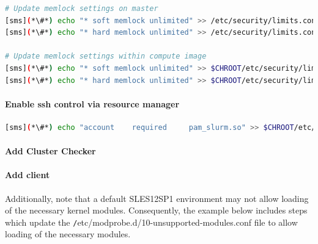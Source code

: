 \documentclass[letterpaper]{article}
\newcommand{\baseOS}{SLES12SP1}
\begin{document}
 

\begin{lstlisting}[language=bash,keywords={},upquote=true]
# Update memlock settings on master
[sms](*\#*) echo "* soft memlock unlimited" >> /etc/security/limits.conf
[sms](*\#*) echo "* hard memlock unlimited" >> /etc/security/limits.conf

# Update memlock settings within compute image
[sms](*\#*) echo "* soft memlock unlimited" >> $CHROOT/etc/security/limits.conf
[sms](*\#*) echo "* hard memlock unlimited" >> $CHROOT/etc/security/limits.conf
\end{lstlisting}


\paragraph{Enable ssh control via resource manager} 



\begin{lstlisting}[language=bash,keywords={},upquote=true]
[sms](*\#*) echo "account    required     pam_slurm.so" >> $CHROOT/etc/pam.d/sshd
\end{lstlisting}

\paragraph{Add Cluster Checker} \label{sec:add_clck}


\paragraph{Add \Lustre{} client} \label{sec:lustre_client}


Additionally, note that a default \baseOS{} environment may not allow loading of
the necessary \Lustre{} kernel modules. Consequently, the example below includes
steps which update the {\texttt /etc/modprobe.d/10-unsupported-modules.conf}
file to allow loading of the necessary modules.
\end{document}
